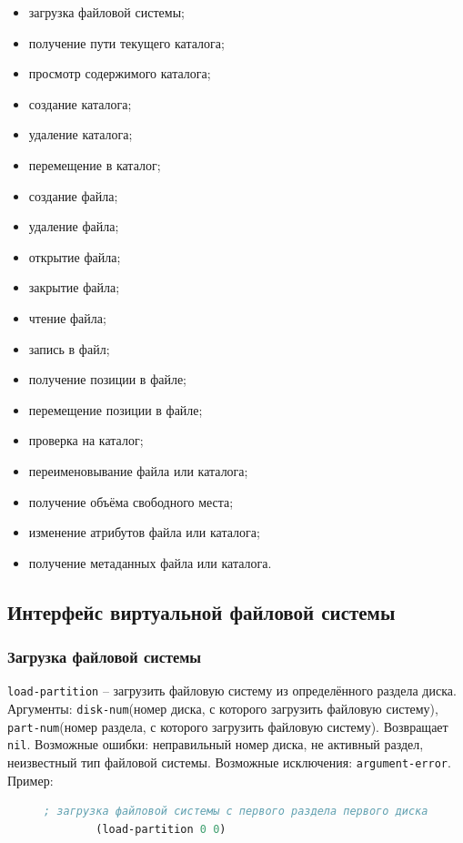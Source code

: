 \begin{itemize}
\item загрузка файловой системы;
\item получение пути текущего каталога;
\item просмотр содержимого каталога;
\item создание каталога;
\item удаление каталога;
\item перемещение в каталог;
\item создание файла;
\item удаление файла;
\item открытие файла;
\item закрытие файла;
\item чтение файла;
\item запись в файл;
\item получение позиции в файле;
\item перемещение позиции в файле;
\item проверка на каталог;
\item переименовывание файла или каталога;
\item получение объёма свободного места;
\item изменение атрибутов файла или каталога;
\item получение метаданных файла или каталога.
\end{itemize}

\subsection{Интерфейс виртуальной файловой системы}

\subsubsection{Загрузка файловой системы}

\texttt{load-partition} -- загрузить файловую систему из определённого раздела диска. Аргументы: \texttt{disk-num}(номер диска, с которого загрузить файловую систему), \texttt{part-num}(номер раздела, с которого загрузить файловую систему). Возвращает \texttt{nil}. Возможные ошибки: неправильный номер диска, не активный раздел, неизвестный тип файловой системы. Возможные исключения: \texttt{argument-error}. Пример:
\begin{figure}[H]
	\begin{lstlisting}[language=Lisp]
		; загрузка файловой системы с первого раздела первого диска
		(load-partition 0 0)
	\end{lstlisting}
\end{figure}

